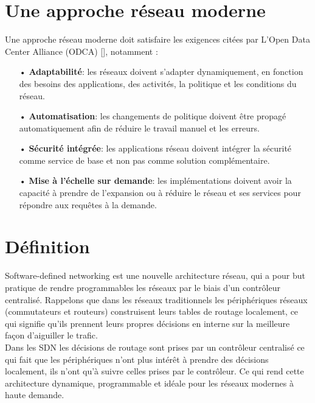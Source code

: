 \newpage
\section{Une approche réseau moderne}
Une approche réseau moderne doit satisfaire les exigences citées par L’Open Data Center Alliance (ODCA)  [\cite{2}], notamment :\\
\begin{itemize}
\item[•] \textbf{Adaptabilité}: les réseaux doivent s’adapter dynamiquement, en fonction des besoins des applications, des activités, la politique et les conditions du réseau.\\
\item[•] \textbf{Automatisation}: les changements de politique doivent être propagé automatiquement afin de réduire le travail manuel et les erreurs.\\
\item[•] \textbf{Sécurité intégrée}: les applications réseau doivent intégrer la sécurité comme service de base et non pas comme solution complémentaire.\\
\item[•] \textbf{Mise à l’échelle sur demande}: les implémentations doivent avoir la capacité à prendre de l’expansion ou à réduire le réseau et ses services pour répondre aux requêtes à la demande.
\end{itemize}


\section{Définition}

Software-defined networking est une nouvelle architecture réseau, qui a pour but pratique de rendre programmables les réseaux par le biais d’un contrôleur centralisé. Rappelons que dans les réseaux traditionnels les périphériques réseaux (commutateurs et routeurs) construisent leurs tables de routage localement, ce qui signifie qu’ils prennent leurs propres décisions en interne sur la meilleure façon d’aiguiller le trafic. \\

Dans les SDN les décisions de routage sont prises par un contrôleur centralisé ce qui fait que les périphériques n’ont plus intérêt à prendre des décisions localement, ils n’ont qu’à suivre celles prises par le contrôleur. Ce qui rend cette architecture dynamique, programmable et idéale pour les réseaux modernes à haute demande.

